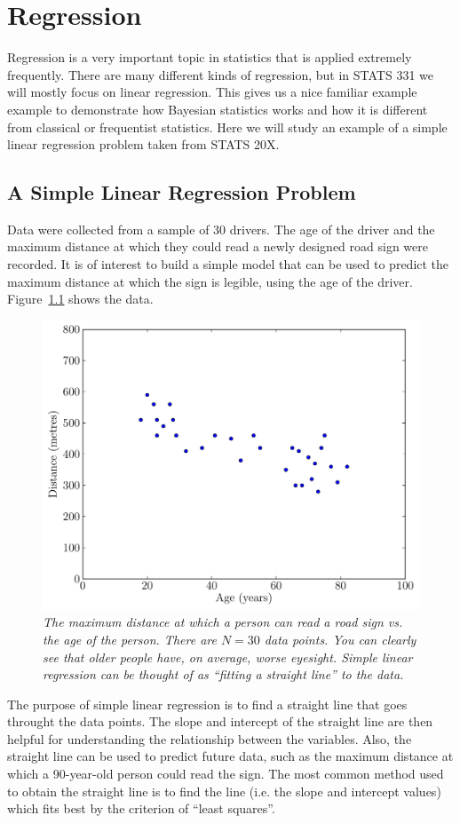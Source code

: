 \chapter{Regression}
Regression is a very important topic in statistics that is applied extremely
frequently. There are many different kinds of regression, but in STATS 331 we will
mostly focus on linear regression. This gives us a nice familiar example
example to demonstrate how Bayesian statistics works and how it is different
from classical or frequentist statistics. Here we will study an example of a
simple linear regression problem taken from STATS 20X.

\section{A Simple Linear Regression Problem}
Data were collected from a sample of 30 drivers. The age of the driver and the 
maximum distance at which they could read a newly designed road sign were 
recorded. It is of interest to build a simple model that can be used to predict the 
maximum distance at which the sign is legible, using the age of the driver.
Figure~\ref{fig:road} shows the data.
\begin{figure}
\begin{center}
\includegraphics[scale=0.5]{Figures/road.pdf}
\caption{\it The maximum distance at which a person can read a road sign vs. the age of
the person. There are $N=30$ data points. You can clearly see that older people
have, on average, worse eyesight. Simple linear regression can be thought of as
``fitting a straight line'' to the data.
\label{fig:road}}
\end{center}
\end{figure}
The purpose of simple linear regression is to find a straight line that goes
throught the data points. The slope and intercept of the straight line are then
helpful for understanding the relationship between the variables. Also, the straight line can be used
to predict future data, such as the maximum distance at which a 90-year-old person
could read the sign. The most common method used to obtain the straight
line is to find the line (i.e. the slope and intercept values) which fits best
by the criterion of ``least squares''.

